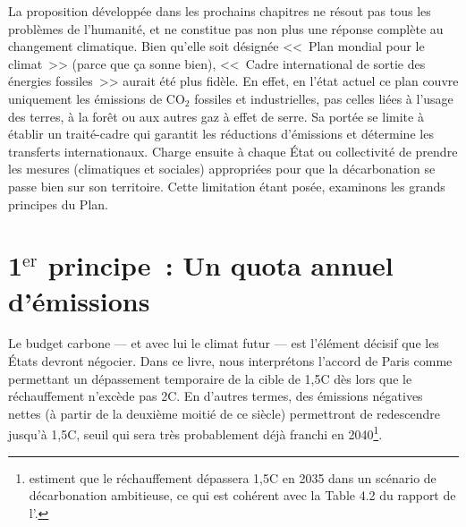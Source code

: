 \documentclass[a5paper,french]{memoir}
\begin{document}
La proposition développée dans les prochains chapitres ne résout pas tous les problèmes de l'humanité, et ne constitue pas non plus une réponse complète au changement climatique. Bien qu'elle soit désignée <<~Plan mondial pour le climat~>> (parce que ça sonne bien), <<~Cadre international de sortie des énergies fossiles~>> aurait été plus fidèle.  %
En effet, en l'état actuel ce plan couvre uniquement les émissions de CO$_\text{2}$ fossiles et industrielles, pas celles liées à l'usage des terres, à la forêt ou aux autres gaz à effet de serre. %
Sa portée se limite à établir un traité-cadre qui garantit les réductions d'émissions et détermine les transferts internationaux. Charge ensuite à chaque État ou collectivité de prendre les mesures (climatiques et sociales) appropriées pour que la décarbonation se passe bien sur son territoire. Cette limitation étant posée, examinons les grands principes du Plan.

\section{1$^\text{er}$ principe~: Un quota annuel d'émissions}

Le budget carbone --- et avec lui le climat futur --- est l'élément décisif que les États devront négocier. Dans ce livre, nous interprétons l'accord de Paris comme permettant un dépassement temporaire de la cible de 1,5\textdegree{}C dès lors que le réchauffement n'excède pas 2\textdegree{}C. En d'autres termes, des émissions négatives nettes (à partir de la deuxième moitié de ce siècle) permettront de redescendre jusqu'à 1,5\textdegree{}C, seuil qui sera très probablement déjà franchi en 2040\footnote{\citet{diffenbaugh_data-driven_2023} estiment que le réchauffement dépassera 1,5\textdegree{}C en 2035 dans un scénario de décarbonation ambitieuse, ce qui est cohérent avec la Table 4.2 du rapport de l'\citet{ipcc_climate_2021}.}. 
\end{document}
